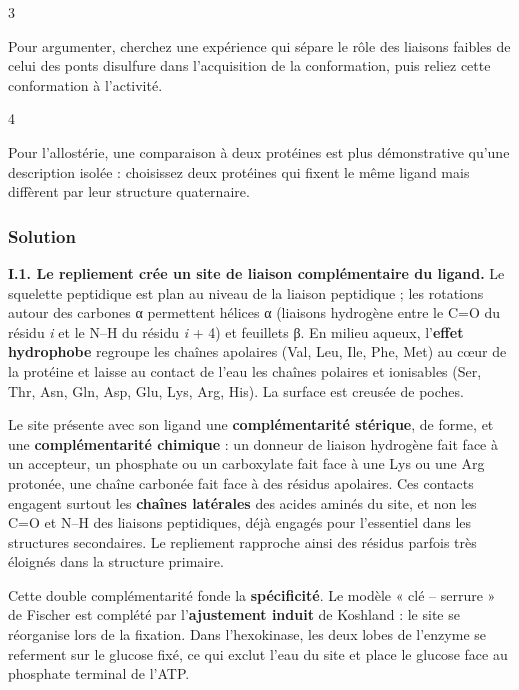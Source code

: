 \documentclass[11pt,a4paper]{article}
\begin{document}
\begin{indication}{3}

Pour argumenter, cherchez une expérience qui sépare le rôle des liaisons faibles de celui des ponts disulfure dans l'acquisition de la conformation, puis reliez cette conformation à l'activité.

\end{indication}

\begin{indication}{4}

Pour l'allostérie, une comparaison à deux protéines est plus démonstrative qu'une description isolée : choisissez deux protéines qui fixent le même ligand mais diffèrent par leur structure quaternaire.

\end{indication}

\hypertarget{solution-4}{%
\subsubsection{Solution}\label{solution-4}}

\textbf{I.1. Le repliement crée un site de liaison complémentaire du ligand.} Le squelette peptidique est plan au niveau de la liaison peptidique ; les rotations autour des carbones α permettent hélices α (liaisons hydrogène entre le C=O du résidu \emph{i} et le N--H du résidu \emph{i} + 4) et feuillets β. En milieu aqueux, l'\textbf{effet hydrophobe} regroupe les chaînes apolaires (Val, Leu, Ile, Phe, Met) au cœur de la protéine et laisse au contact de l'eau les chaînes polaires et ionisables (Ser, Thr, Asn, Gln, Asp, Glu, Lys, Arg, His). La surface est creusée de poches.

Le site présente avec son ligand une \textbf{complémentarité stérique}, de forme, et une \textbf{complémentarité chimique} : un donneur de liaison hydrogène fait face à un accepteur, un phosphate ou un carboxylate fait face à une Lys ou une Arg protonée, une chaîne carbonée fait face à des résidus apolaires. Ces contacts engagent surtout les \textbf{chaînes latérales} des acides aminés du site, et non les C=O et N--H des liaisons peptidiques, déjà engagés pour l'essentiel dans les structures secondaires. Le repliement rapproche ainsi des résidus parfois très éloignés dans la structure primaire.

Cette double complémentarité fonde la \textbf{spécificité}. Le modèle « clé -- serrure » de Fischer est complété par l'\textbf{ajustement induit} de Koshland : le site se réorganise lors de la fixation. Dans l'hexokinase, les deux lobes de l'enzyme se referment sur le glucose fixé, ce qui exclut l'eau du site et place le glucose face au phosphate terminal de l'ATP.
\end{document}
